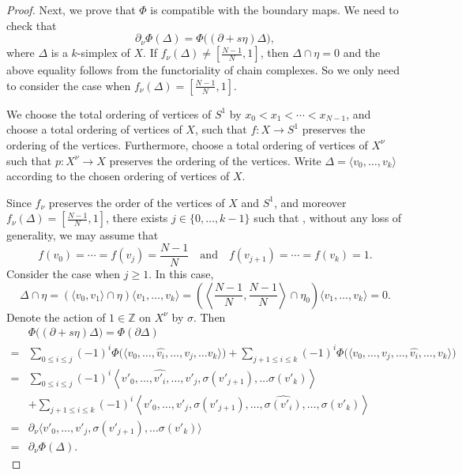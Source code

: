\documentclass[10pt,a4paper]{amsart}
\newcommand{\Z}{\mathbb{Z}}
\begin{document}
\begin{proof}
Next, we prove that $\Phi$ is compatible with the boundary maps. We need to check that
\[
\partial_\nu\Phi(\Delta)=\Phi\big((\partial+s\eta)\Delta\big),
\]
where $\Delta$ is a $k$-simplex of $X$. 
If $f_\nu(\Delta)\neq [\frac{N-1}{N}, 1]$, then $\Delta\cap \eta=0$ and the above equality follows from the functoriality of chain complexes. 
So we only need to consider the case when $f_\nu(\Delta)=[\frac{N-1}{N}, 1]$. 

We choose the total ordering of vertices of $S^1$ by $x_0<x_1<\cdots <x_{N-1}$, and choose a total ordering of vertices of $X$, such that $f\colon X\to S^1$ preserves the ordering of the vertices. Furthermore, choose a total ordering of vertices of $X^\nu$ such that $p\colon X^\nu\to X$ preserves the ordering of the vertices. Write $\Delta=\langle v_0, \ldots, v_k\rangle$ according to the chosen ordering of vertices of $X$. 
 
Since $f_\nu$ preserves the order of the vertices of $X$ and $S^1$, and moreover $f_\nu(\Delta)=[\frac{N-1}{N}, 1]$, there exists $j\in \{0, \ldots, k-1\}$ such that ,
without any loss of generality, we may assume that
\[
f(v_0)=\cdots=f(v_j)=\frac{N-1}{N}\quad \text{and}\quad f(v_{j+1})=\cdots=f(v_k)=1.
\]
Consider the case when $j\geq 1$. In this case, 
\[
\Delta\cap \eta=(\langle v_0, v_1\rangle\cap \eta)\langle v_1, \dots, v_k\rangle=\left(\left\langle \frac{N-1}{N}, \frac{N-1}{N}\right\rangle\cap \eta_0\right)\langle v_1, \dots, v_k\rangle=0.
\]
Denote the action of $1\in \Z$ on $X^{\nu}$ by $\sigma$. Then
\begin{align*}
&\Phi\big((\partial+s\eta)\Delta\big)=\Phi(\partial\Delta)\\
=&\sum_{0\leq i\leq j}(-1)^i\Phi\big(\langle v_0, \ldots, \widehat{v_i}, \ldots, v_j, \ldots v_k\rangle\big)+\sum_{j+1\leq i\leq k}(-1)^i\Phi\big(\langle v_0, \ldots, v_j, \ldots, \widehat{v_i}, \ldots, v_k\rangle\big)\\
=&\sum_{0\leq i\leq j}(-1)^i\left\langle v'_0, \ldots, \widehat{v'_i}, \ldots, v'_j, \sigma(v'_{j+1}), \ldots \sigma(v'_k)\right\rangle\\
&+\sum_{j+1\leq i\leq k}(-1)^i\left\langle v'_0, \ldots, v'_j, \sigma(v'_{j+1}), \ldots, \widehat{\sigma(v'_i)}, \ldots, \sigma(v'_k)\right\rangle\\
=&\partial_\nu\langle v'_0, \ldots, v'_j, \sigma(v'_{j+1}), \ldots \sigma(v'_k)\rangle\\
=&\partial_\nu\Phi(\Delta).
\end{align*}


\end{proof}
\end{document}
